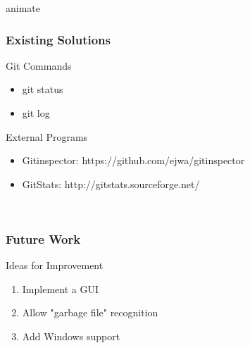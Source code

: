\documentclass{beamer}
\begin{document}
\begin{frame}{animate}
	\centering
	\frametitle{Existing Solutions}
	
	\begin{block}{Git Commands}
		\begin{itemize}
			\item git status
			\item git log
		\end{itemize}
	\end{block}
	
	\pause
	
	\begin{block}{External Programs}
		\begin{itemize}
			\item Gitinspector: https://github.com/ejwa/gitinspector
			\item GitStats: http://gitstats.sourceforge.net/
		\end{itemize}
	\end{block}
	
	\pause	
	
	
	\

\end{frame}








\begin{frame}
    \centering
    \frametitle{Future Work}
    
    \begin{block}{Ideas for Improvement}
    		\begin{enumerate}
    			\item Implement a GUI
    			\item Allow "garbage file" recognition
    			\item Add Windows support
    		\end{enumerate}
    \end{block}
    
\end{frame}
\end{document}
